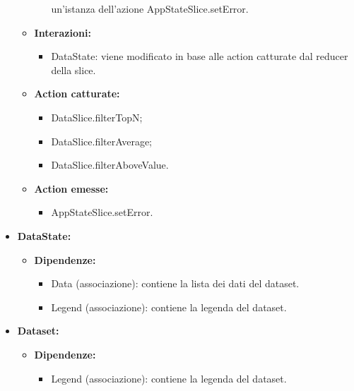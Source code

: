 \begin{itemize}
\begin{itemize}
\begin{itemize}
                              un'istanza dell'azione AppStateSlice.setError.
                    \end{itemize}
              \item \textbf{Interazioni:}
                    \begin{itemize}
                        \item DataState: viene modificato in base alle action catturate dal reducer della
                              slice.
                    \end{itemize}
              \item \textbf{Action catturate:}
                    \begin{itemize}
                        \item DataSlice.filterTopN;
                        \item DataSlice.filterAverage;
                        \item DataSlice.filterAboveValue.
                    \end{itemize}
              \item \textbf{Action emesse:}
                    \begin{itemize}
                        \item AppStateSlice.setError.
                    \end{itemize}
          \end{itemize}

    \item \textbf{DataState:}
          \begin{itemize}
              \item \textbf{Dipendenze:}
                    \begin{itemize}
                        \item Data (associazione): contiene la lista dei dati del dataset.
                        \item Legend (associazione): contiene la legenda del dataset.
                    \end{itemize}
          \end{itemize}

    \item \textbf{Dataset:}
          \begin{itemize}
              \item \textbf{Dipendenze:}
                    \begin{itemize}
                        \item Legend (associazione): contiene la legenda del dataset.
                    \end{itemize}
          \end{itemize}


\end{itemize}
